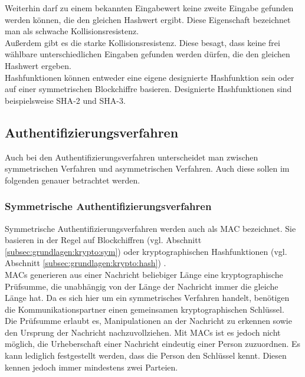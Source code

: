 		Weiterhin darf zu einem bekannten Eingabewert keine zweite Eingabe gefunden werden können, die den gleichen Hashwert ergibt. Diese Eigenschaft bezeichnet man als schwache Kollisionsresistenz.\\
		
		Außerdem gibt es die starke Kollisionsresistenz. Diese besagt, dass keine frei wählbare unterschiedlichen Eingaben gefunden werden dürfen, die den gleichen Hashwert ergeben.\\
		
		Hashfunktionen können entweder eine eigene designierte Hashfunktion sein oder auf einer symmetrischen Blockchiffre basieren. Designierte Hashfunktionen sind beispielsweise \ac{SHA}-2 und SHA-3.
		
		\subsection{Authentifizierungsverfahren}
		\label{subsec:grundlagen:krypto:auth}
		
		Auch bei den Authentifizierungsverfahren unterscheidet man zwischen symmetrischen Verfahren und asymmetrischen Verfahren. Auch diese sollen im folgenden genauer betrachtet werden.
		
			\subsubsection{Symmetrische Authentifizierungsverfahren}
			\label{subsubsec:grundlagen:krypto:auth:sym}
			
			Symmetrische Authentifizierungsverfahren werden auch als \Ac{MAC} bezeichnet. Sie basieren in der Regel auf Blockchiffren (vgl. Abschnitt \ref{subsec:grundlagen:krypto:sym}) oder kryptographischen Hashfunktionen (vgl. Abschnitt \ref{subsec:grundlagen:krypto:hash}) \cite{Kuesters2011-B}.\\
			
			MACs generieren aus einer Nachricht beliebiger Länge eine kryptographische Prüfsumme, die unabhängig von der Länge der Nachricht immer die gleiche Länge hat. Da es sich hier um ein symmetrisches Verfahren handelt, benötigen die Kommunikationspartner einen gemeinsamen kryptographischen Schlüssel.\\
			
			Die Prüfsumme erlaubt es, Manipulationen an der Nachricht zu erkennen sowie den Ursprung der Nachricht nachzuvollziehen. Mit MACs ist es jedoch nicht möglich, die Urheberschaft einer Nachricht eindeutig einer Person zuzuordnen. Es kann lediglich festgestellt werden, dass die Person den Schlüssel kennt. Diesen kennen jedoch immer mindestens zwei Parteien.\\
			
